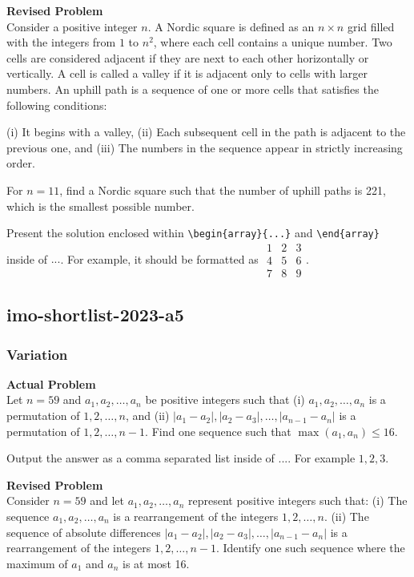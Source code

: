 \textbf{Revised Problem}\\
Consider a positive integer $n$. A Nordic square is defined as an $n \times n$ grid filled with the integers from $1$ to $n^2$, where each cell contains a unique number. Two cells are considered adjacent if they are next to each other horizontally or vertically. A cell is called a valley if it is adjacent only to cells with larger numbers. An uphill path is a sequence of one or more cells that satisfies the following conditions:

(i) It begins with a valley,
(ii) Each subsequent cell in the path is adjacent to the previous one, and
(iii) The numbers in the sequence appear in strictly increasing order.

For $n = 11$, find a Nordic square such that the number of uphill paths is 221, which is the smallest possible number.

Present the solution enclosed within \verb|\begin{array}{...}| and \verb|\end{array}| inside of $\boxed{...}$. For example, it should be formatted as $\boxed{\begin{array}{ccc}1 & 2 & 3 \\ 4 & 5 & 6 \\ 7 & 8 & 9\end{array}}$.

\subsection{imo-shortlist-2023-a5}
\subsubsection{Variation}
\textbf{Actual Problem}\\
Let $n = 59$ and $a_1, a_2, \ldots, a_n$ be positive integers such that
(i) $a_1, a_2, \ldots, a_n$ is a permutation of $1, 2, \ldots, n$, and
(ii) $|a_1 - a_2|, |a_2 - a_3|, \ldots, |a_{n-1} - a_{n}|$ is a permutation of $1, 2, \ldots, {n-1}$.
Find one sequence such that $\max(a_1, a_n) \leq 16$.

Output the answer as a comma separated list inside of $\boxed{...}$. For example $\boxed{1, 2, 3}$.

\textbf{Revised Problem}\\
Consider $n = 59$ and let $a_1, a_2, \ldots, a_n$ represent positive integers such that:
(i) The sequence $a_1, a_2, \ldots, a_n$ is a rearrangement of the integers $1, 2, \ldots, n$.
(ii) The sequence of absolute differences $|a_1 - a_2|, |a_2 - a_3|, \ldots, |a_{n-1} - a_{n}|$ is a rearrangement of the integers $1, 2, \ldots, n-1$.
Identify one such sequence where the maximum of $a_1$ and $a_n$ is at most 16.

